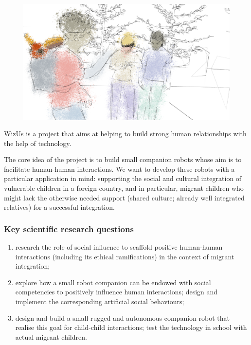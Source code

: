 \documentclass[11pt]{report}
\newcommand{\project}{WizUs\xspace}
\begin{document}
\begin{figure}[!htbp]
    \centering
    \includegraphics[width=0.9\linewidth]{figs/render5-colors.png}
\end{figure}

\project is a project that aims at helping to build strong human
relationships with the help of technology.

The core idea of the project is to build small companion robots whose
aim is to facilitate human-human interactions. We want to develop these
robots with a particular application in mind: supporting the social and
cultural integration of vulnerable children in a foreign country, and in
particular, migrant children who might lack the otherwise needed support
(shared culture; already well integrated relatives) for a successful
integration.

\subsubsection{Key scientific research questions}

\begin{enumerate}
\item research the role of social influence to scaffold positive human-human
    interactions (including its ethical ramifications) in the context of migrant
    integration;
\item explore how a small robot companion can be endowed with social
    competencies to positively influence human interactions; design and
    implement the corresponding artificial social behaviours;
\item design and build a small rugged and autonomous companion robot that
    realise this goal for child-child interactions; test the technology in
    school with actual migrant children.
\end{enumerate}
\end{document}
